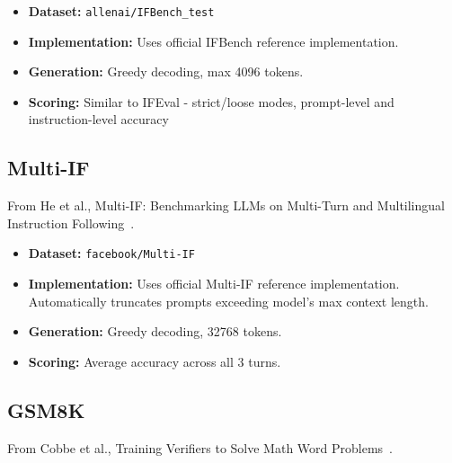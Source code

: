 \documentclass{article}
\begin{document}
\begin{itemize}
    \item \textbf{Dataset:} \texttt{allenai/IFBench\_test}
    \item \textbf{Implementation:} Uses official IFBench reference implementation.
    \item \textbf{Generation:} Greedy decoding, max 4096 tokens.
    \item \textbf{Scoring:} Similar to IFEval - strict/loose modes, prompt-level and instruction-level accuracy
\end{itemize}

\subsection*{Multi-IF}

From He et al., Multi-IF: Benchmarking LLMs on Multi-Turn and Multilingual Instruction Following~\citep{he2024multiif}. 

\begin{itemize}
    \item \textbf{Dataset:} \texttt{facebook/Multi-IF}
    \item \textbf{Implementation:} Uses official Multi-IF reference implementation. Automatically truncates prompts exceeding model's max context length.
    \item \textbf{Generation:} Greedy decoding, 32768 tokens.
    \item \textbf{Scoring:} Average accuracy across all 3 turns.
\end{itemize}

\subsection*{GSM8K}

From Cobbe et al., Training Verifiers to Solve Math Word Problems~\citep{cobbe2021gsm8k}.
\end{document}
